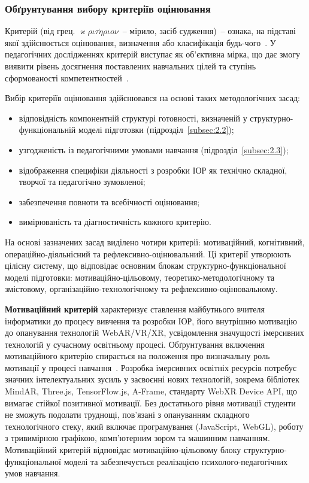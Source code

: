 \subsubsection{Обґрунтування вибору критеріїв оцінювання}

Критерій (від грец. $\varkappa\rho\iota\tau\acute{\eta}\rho\iota o\nu$~-- мірило, засіб судження)~-- ознака, на підставі якої здійснюється оцінювання, визначення або класифікація будь-чого~\cite{Goncharenko1997Dictionary}. У педагогічних дослідженнях критерій виступає як об'єктивна мірка, що дає змогу виявити рівень досягнення поставлених навчальних цілей та ступінь сформованості компетентностей~\cite{Goncharenko2011Pedagogy}.

Вибір критеріїв оцінювання здійснювався на основі таких методологічних засад:
\begin{itemize}
\item відповідність компонентній структурі готовності, визначеній у структурно-функціональній моделі підготовки (підрозділ~\ref{subsec:2.2});
\item узгодженість із педагогічними умовами навчання (підрозділ~\ref{subsec:2.3});
\item відображення специфіки діяльності з розробки ІОР як технічно складної, творчої та педагогічно зумовленої;
\item забезпечення повноти та всебічності оцінювання;
\item вимірюваність та діагностичність кожного критерію.
\end{itemize}

На основі зазначених засад виділено чотири критерії: мотиваційний, когнітивний, операційно-діяльнісний та рефлексивно-оцінювальний. Ці критерії утворюють цілісну систему, що відповідає основним блокам структурно-функціональної моделі підготовки: мотиваційно-цільовому, теоретико-методологічному та змістовому, організаційно-технологічному та рефлексивно-оцінювальному.

\textbf{Мотиваційний критерій} характеризує ставлення майбутнього вчителя інформатики до процесу вивчення та розробки ІОР, його внутрішню мотивацію до опанування технологій WebAR/VR/XR, усвідомлення значущості імерсивних технологій у сучасному освітньому процесі. Обґрунтування включення мотиваційного критерію спирається на положення про визначальну роль мотивації у процесі навчання~\cite{Ziaziun2000Philosophy}. Розробка імерсивних освітніх ресурсів потребує значних інтелектуальних зусиль у засвоєнні нових технологій, зокрема бібліотек MindAR, Three.js, TensorFlow.js, A-Frame, стандарту WebXR Device API, що вимагає стійкої позитивної мотивації. Без достатнього рівня мотивації студенти не зможуть подолати труднощі, пов'язані з опануванням складного технологічного стеку, який включає програмування (JavaScript, WebGL), роботу з тривимірною графікою, комп'ютерним зором та машинним навчанням. Мотиваційний критерій відповідає мотиваційно-цільовому блоку структурно-функціональної моделі та забезпечується реалізацією психолого-педагогічних умов навчання.

